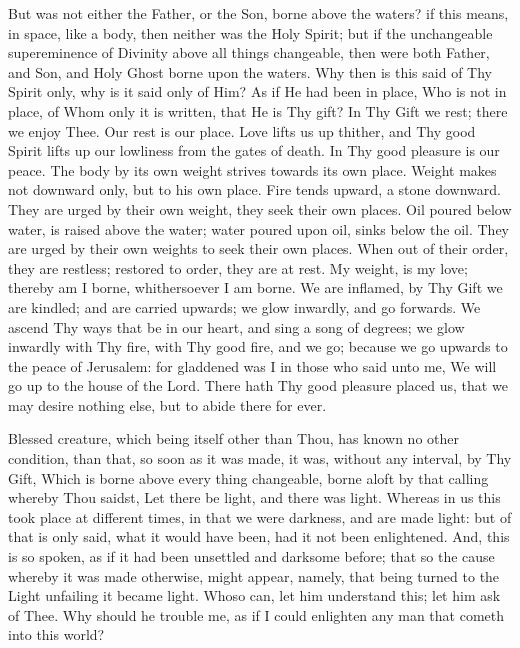 \documentclass[b5paper,openright,12pt,twoside]{book}
\begin{document}
But was not either the Father, or the Son, borne above the waters? if
this means, in space, like a body, then neither was the Holy Spirit;
but if the unchangeable supereminence of Divinity above all things
changeable, then were both Father, and Son, and Holy Ghost borne upon
the waters. Why then is this said of Thy Spirit only, why is it said
only of Him? As if He had been in place, Who is not in place, of Whom
only it is written, that He is Thy gift? In Thy Gift we rest; there we
enjoy Thee. Our rest is our place. Love lifts us up thither, and Thy
good Spirit lifts up our lowliness from the gates of death. In Thy good
pleasure is our peace. The body by its own weight strives towards its
own place. Weight makes not downward only, but to his own place. Fire
tends upward, a stone downward. They are urged by their own weight,
they seek their own places. Oil poured below water, is raised above the
water; water poured upon oil, sinks below the oil. They are urged by
their own weights to seek their own places. When out of their order,
they are restless; restored to order, they are at rest. My weight, is my
love; thereby am I borne, whithersoever I am borne. We are inflamed, by
Thy Gift we are kindled; and are carried upwards; we glow inwardly, and
go forwards. We ascend Thy ways that be in our heart, and sing a song of
degrees; we glow inwardly with Thy fire, with Thy good fire, and we go;
because we go upwards to the peace of Jerusalem: for gladdened was I in
those who said unto me, We will go up to the house of the Lord. There
hath Thy good pleasure placed us, that we may desire nothing else, but
to abide there for ever.

Blessed creature, which being itself other than Thou, has known no
other condition, than that, so soon as it was made, it was, without
any interval, by Thy Gift, Which is borne above every thing changeable,
borne aloft by that calling whereby Thou saidst, Let there be light, and
there was light. Whereas in us this took place at different times, in
that we were darkness, and are made light: but of that is only said,
what it would have been, had it not been enlightened. And, this is so
spoken, as if it had been unsettled and darksome before; that so the
cause whereby it was made otherwise, might appear, namely, that being
turned to the Light unfailing it became light. Whoso can, let him
understand this; let him ask of Thee. Why should he trouble me, as if I
could enlighten any man that cometh into this world?
\end{document}
